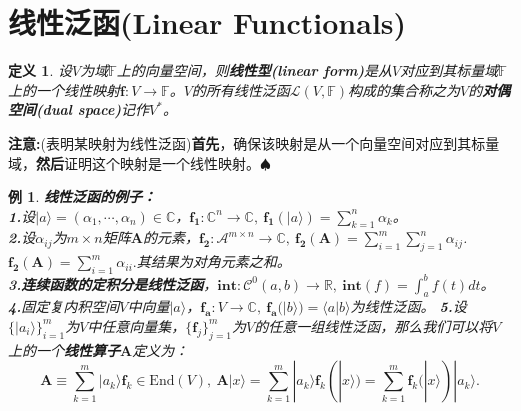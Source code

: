 \documentclass[mathserif,hyperref,UTF8,openany,b5paper]{ctexbook}
\newtheorem{exmp}{例}[section]
\newtheorem{defn}{定义}[section]
\begin{document}
\section{线性泛函(Linear Functionals)}
\begin{defn}
设$V$为域$\mathbb{F}$上的向量空间，则\textbf{线性型(linear form)}是从$V$对应到其标量域$\mathbb{F}$上的一个线性映射$\mathbf{f}:V\xrightarrow{}\mathbb{F}$。$V$的所有线性泛函$\mathcal{L}(V,\mathbb{F})$构成的集合称之为$V$的\textbf{对偶空间(dual space)}记作$V^*$。
\end{defn}
\textbf{注意:}(表明某映射为线性泛函)\textbf{首先}，确保该映射是从一个向量空间对应到其标量域，\textbf{然后}证明这个映射是一个线性映射。$\spadesuit$
\begin{exmp}\textbf{线性泛函的例子：}\\
\textbf{1.}设$|a\rangle=(\alpha_1,\cdots,\alpha_n)\in\mathbb{C}$，$\mathbf{f_1}:\mathbb{C}^n\xrightarrow{}\mathbb{C},\ \mathbf{f_1}(|a\rangle)=\sum^n_{k=1}\alpha_k$。\\
\textbf{2.}设$\alpha_{ij}$为$m\times n$矩阵$\mathbf{A}$的元素，$\mathbf{f_2}:\mathcal{A}^{m\times n}\xrightarrow{}\mathbb{C},\ \mathbf{f_2}(\mathbf{A})=\sum^m_{i=1}\sum^n_{j=1}\alpha_{ij}$.$\mathbf{f_2}(\mathbf{A})=\sum^m_{i=1}\alpha_{ii}.$其结果为对角元素之和。\\
\textbf{3.}\textbf{连续函数的定积分是线性泛函}，$\mathbf{int}:\mathcal{C}^0(a,b)\xrightarrow{}\mathbb{R},\ \mathbf{int}(f)=\int^b_a f(t)dt$。
\textbf{4.}固定复内积空间$V$中向量$|a\rangle$，$\mathbf{f_a}:V\xrightarrow{} \mathbb{C},\ \mathbf{f_a}(|b\rangle)=\langle a|b\rangle$为线性泛函。
\textbf{5.}设$\{|a_i\rangle\}^m_{i=1}$为$V$中任意向量集，$\{\mathbf{f}_j\}^m_{j=1}$为$V$的任意一组线性泛函，那么我们可以将$V$上的一个\textbf{线性算子}$\mathbf{A}$定义为：
\begin{equation}
    \mathbf{A}\equiv\sum^m_{k=1}|a_k\rangle\mathbf{f}_k\in\mbox{End}(V), \ \mathbf{A}|x\rangle = \sum^m_{k=1}|a_k\rangle\mathbf{f}_k(|x\rangle)=\sum^m_{k=1}\mathbf{f}_k(|x\rangle)|a_k\rangle.
\end{equation}
\end{exmp}
\end{document}
